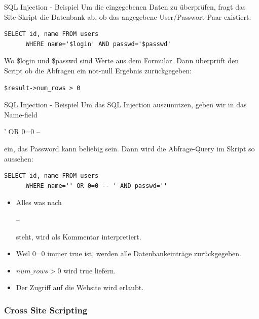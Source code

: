 \documentclass[10pt]{beamer}
\begin{document}
\begin{frame}[fragile]{SQL Injection - Beispiel}
  Um die eingegebenen Daten zu \"uberpr\"ufen, fragt das Site-Skript die Datenbank ab, ob das angegebene User/Passwort-Paar existiert:
  \newline
  \begin{lstlisting}[style=SQLStyle]
    SELECT id, name FROM users
      WHERE name='$login' AND passwd='$passwd'
  \end{lstlisting}
  Wo \$login und \$passwd sind Werte aus dem Formular.
  \newline
  Dann \"uberpr\"uft den Script ob die Abfragen ein not-null Ergebnis zur\"uckgegeben:
  \newline
  \begin{lstlisting}[style=PHPStyle]
    $result->num_rows > 0
  \end{lstlisting}
\end{frame}

\begin{frame}[fragile]{SQL Injection - Beispiel}
  Um das SQL Injection auszunutzen, geben wir in das Name-field {\fboxsep=0pt\colorbox{mGreen!50}{\strut ' OR 0=0 -- }} ein, das Password kann beliebig sein.
  \newline
  Dann wird die Abfrage-Query im Skript so aussehen:
  \newline
  \begin{lstlisting}[style=SQLStyle]
    SELECT id, name FROM users
      WHERE name='' OR 0=0 -- ' AND passwd=''
  \end{lstlisting}
  \begin{itemize}
    \item Alles was nach {\fboxsep=0pt\colorbox{mGreen!50}{\strut -- }} steht, wird als Kommentar interpretiert.
    \item Weil 0=0 immer true ist, werden alle Datenbankeintr\"age zur\"uckgegeben.
    \item $num\_rows>0$ wird true liefern.
    \item Der Zugriff auf die Website wird erlaubt.
  \end{itemize}

\end{frame}


\subsubsection{Cross Site Scripting}
\end{document}

